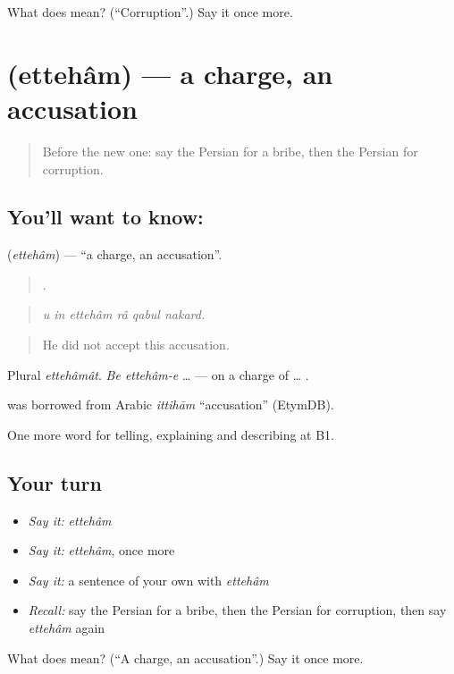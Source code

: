 \begin{tcolorbox}[breakable,colback=teal!4,colframe=teal!35!black,title={Before you move on}]
What does  mean? (\textquotedblleft{}Corruption\textquotedblright{}.) Say it once more.
\end{tcolorbox}
\section[\texorpdfstring{\fa{اتهام} (ettehâm)}{اتهام (ettehâm)}]{ (ettehâm) — a charge, an accusation}

\label{lesson:FA-C408-etteham}



\begin{quote}
Before the new one: say the Persian for a bribe, then the Persian for corruption.
\end{quote}

\subsection*{You'll want to know: }
\textbf{} (\emph{ettehâm}) — \textquotedblleft{}a charge, an accusation\textquotedblright{}.

\begin{quote}
     .
\end{quote}

\begin{quote}
\emph{u in ettehâm râ qabul nakard.}
\end{quote}

\begin{quote}
He did not accept this accusation.
\end{quote}

Plural \emph{ettehâmât}. \emph{Be ettehâm-e} … — on a charge of … .

\begin{cousinweb}
\textbf{} was borrowed from Arabic \emph{ittihām} \textquotedblleft{}accusation\textquotedblright{} (EtymDB).
\end{cousinweb}

\begin{grammarlens}[title={What you've built}]
One more word for telling, explaining and describing at B1.
\end{grammarlens}

\subsection*{Your turn}
\begin{itemize}
\raggedright
  \item \emph{Say it:} \emph{ettehâm}
  \item \emph{Say it:} \emph{ettehâm}, once more
  \item \emph{Say it:} a sentence of your own with \emph{ettehâm}
  \item \emph{Recall:} say the Persian for a bribe, then the Persian for corruption, then say \emph{ettehâm} again
\end{itemize}

\begin{tcolorbox}[breakable,colback=teal!4,colframe=teal!35!black,title={Before you move on}]
What does  mean? (\textquotedblleft{}A charge, an accusation\textquotedblright{}.) Say it once more.
\end{tcolorbox}
